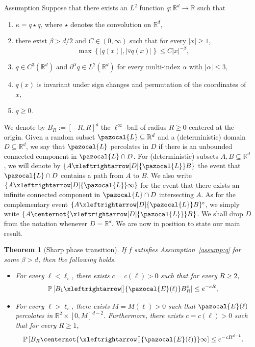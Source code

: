 \documentclass[10pt]{amsart}
\newtheorem{theo}{Theorem}[section]
\theoremstyle{definition}\newtheorem{defi}[theo]{Definition}\newtheorem{rema}[theo]{Remark}\newtheorem{exam}[theo]{Example}\newtheorem{exem}[theo]{Example}\newtheorem{nota}[theo]{Notation}
\renewcommand{\P}{\mathbb{P}}
\newcommand{\R}{\mathbb{R}}
\newcommand{\sfc}{\mathsf{c}}
\newcommand{\lr}[4]{#3\xleftrightarrow[#1]{#2} #4}
\newcommand{\nlr}[4]{#3\centernot{\xleftrightarrow[#1]{#2}} #4}
\newcommand*{\romanenumi}{\renewcommand*{\theenumi}{\roman{enumi}}}
\begin{document}
\begin{enonce}{Assumption}\label{assump:q}
Suppose that there exists an $L^2$ function $q:\R^d\to\R$ such that
\begin{enumerate}\romanenumi
\item\label{Assum1.1.i} $\kappa=q\star q$, where $\star$ denotes the convolution on $\R^d$,
\item\label{Assum1.1.ii} there exist $\beta>d/2$ and $C\in(0,\infty)$ such that for every $|x|\geq1$,
\begin{equation}\label{eq:decay_q}
\max\left\{|q(x)|, \left|\triangledown q(x)\right|\right\}\leq C|x|^{-\beta},
\end{equation}
\item\label{Assum1.1.iii} $q\in C^3(\R^d)$ and $\partial^\alpha q\in L^2(\R^d)$ for every multi-index $\alpha$ with $|\alpha|\leq3$,
\item\label{Assum1.1.iv} $q(x)$ is invariant under sign changes and permutation of the coordinates of $x$,
\item\label{Assum1.1.v} $q\geq 0$.
\end{enumerate}
\end{enonce}


We denote by $B_R:=[-R,R]^d$ the $\ell^\infty$-ball of radius $R\geq0$ centered at the origin. Given a random subset $\pazocal{L}\subseteq\R^d$ and a (deterministic) domain $D\subseteq \R^d$, we say that $\pazocal{L}$ percolates in $D$ if there is an unbounded connected component in $\pazocal{L}\cap D$. For (deterministic) subsets $A,B\subseteq\R^d$, we will denote by
{\small$\{\lr{D}{\pazocal{L}}{A}{B}\}$}
the event that $\pazocal{L}\cap D$ contains a path from $A$ to $B$. We also write
{\small$\{\lr{D}{\pazocal{L}}{A}{\infty}\}
$}
for the event that there exists an infinite connected component in $\pazocal{L}\cap D$ intersecting $A$. As for the complementary event
$\{\lr{D}{\pazocal{L}}{A}{B}\}^{\sfc}$,
we simply write {\small$\{\nlr{D}{\pazocal{L}}{A}{B}\}$}.
We shall drop $D$ from the notation whenever $D=\R^d$. We are now in position to state our main result.

\begin{theo}[Sharp phase transition]\label{thm:sharpness}
If $f$ satisfies Assumption~\ref{assump:q} for some $\beta>d$, then the following holds.
\begin{itemize}
\item For every $\ell<\ell_c$, there exists $c=c(\ell)>0$ such that for every $R\geq2$,
\begin{equation}\label{eq:exp_decay}
\P\left[\lr{}{\pazocal{E}(\ell)}{B_1}{B_R^{\sfc}}\right]\leq e^{-cR},
\end{equation}
\item For every $\ell>\ell_c$, there exists $M=M(\ell)>0$ such that $\pazocal{E}(\ell)$ percolates in $\R^2\times[0,M]^{d-2}$. Furthermore, there exists $c=c(\ell)>0$ such that for every $R\geq1$,
\begin{equation}\label{eq:exp_decay2}
\P\left[\nlr{}{\pazocal{E}(\ell)}{B_R}{\infty}\right]\leq e^{-cR^{d-1}}.
\end{equation}
\end{itemize}
\end{theo}
\end{document}
